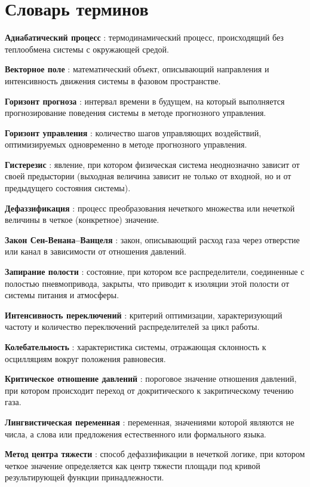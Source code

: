 \chapter*{Словарь терминов}             %

\textbf{Адиабатический процесс} : термодинамический процесс, происходящий без теплообмена системы с окружающей средой.

\textbf{Векторное поле} : математический объект, описывающий направления и интенсивность движения системы в фазовом пространстве.

\textbf{Горизонт прогноза} : интервал времени в будущем, на который выполняется прогнозирование поведения системы в методе прогнозного управления.

\textbf{Горизонт управления} : количество шагов управляющих воздействий, оптимизируемых одновременно в методе прогнозного управления.

\textbf{Гистерезис} : явление, при котором физическая система неоднозначно зависит от своей предыстории (выходная величина зависит не только от входной, но и от предыдущего состояния системы).

\textbf{Дефаззификация} : процесс преобразования нечеткого множества или нечеткой величины в четкое (конкретное) значение.

\textbf{Закон Сен-Венана--Ванцеля} : закон, описывающий расход газа через отверстие или канал в зависимости от отношения давлений.

\textbf{Запирание полости} : состояние, при котором все распределители, соединенные с полостью пневмопривода, закрыты, что приводит к изоляции этой полости от системы питания и атмосферы.

\textbf{Интенсивность переключений} : критерий оптимизации, характеризующий частоту и количество переключений распределителей за цикл работы.

\textbf{Колебательность} : характеристика системы, отражающая склонность к осцилляциям вокруг положения равновесия.

\textbf{Критическое отношение давлений} : пороговое значение отношения давлений, при котором происходит переход от докритического к закритическому течению газа.

\textbf{Лингвистическая переменная} : переменная, значениями которой являются не числа, а слова или предложения естественного или формального языка.

\textbf{Метод центра тяжести} : способ дефаззификации в нечеткой логике, при котором четкое значение определяется как центр тяжести площади под кривой результирующей функции принадлежности.

